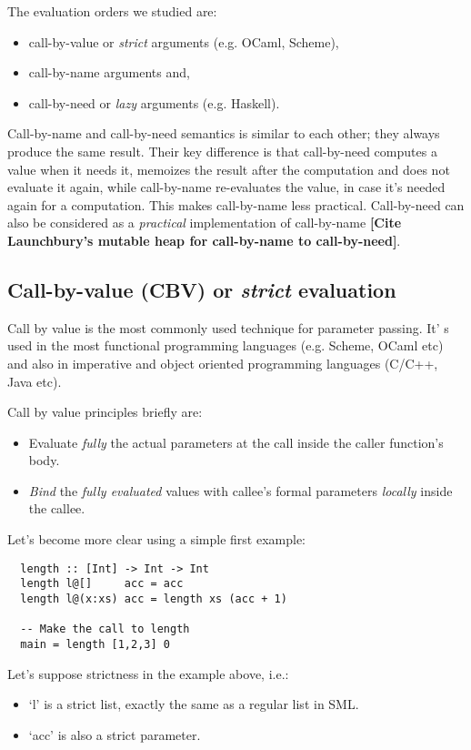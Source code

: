 \documentclass[diploma]{softlab-thesis}
\begin{document}
The evaluation orders we studied are: 
\begin{itemize}
  \item call-by-value or \textit{strict} arguments (e.g. OCaml, Scheme), 
  \item call-by-name arguments and,
  \item call-by-need or \textit{lazy} arguments (e.g. Haskell).
\end{itemize}

Call-by-name and call-by-need semantics is similar to each other; they always produce the same result.
Their key difference is that call-by-need computes a value when it needs it, memoizes the result after the computation 
and does not evaluate it again, while call-by-name re-evaluates the value, in case it's needed again for a computation.
This makes call-by-name less practical. Call-by-need can also be considered as a \textit{practical} implementation 
of call-by-name \textbf{[Cite Launchbury's mutable heap for call-by-name to call-by-need]}.

\subsection {Call-by-value (CBV) or \textit{strict} evaluation }

Call by value is the most commonly used technique for parameter passing. It' s used in the most functional 
programming languages (e.g. Scheme, OCaml etc) and also in imperative and object oriented programming 
languages (C/C++, Java etc).

\par Call by value principles briefly are:
\begin{itemize}
  \item Evaluate \textit{fully} the actual parameters at the call inside the caller function's body.
  \item \textit{Bind} the \textit{fully evaluated} values with callee's formal parameters \textit{locally} inside the callee.
\end{itemize}

Let's become more clear using a simple first example:
\begin{verbatim}
  length :: [Int] -> Int -> Int
  length l@[]     acc = acc 
  length l@(x:xs) acc = length xs (acc + 1)

  -- Make the call to length
  main = length [1,2,3] 0
\end{verbatim}

Let's suppose strictness in the example above, i.e.:
\begin{itemize}
  \item `l' is a strict list, exactly the same as a regular list in SML.
  \item  `acc' is also a strict parameter. 
\end{itemize}
\end{document}
